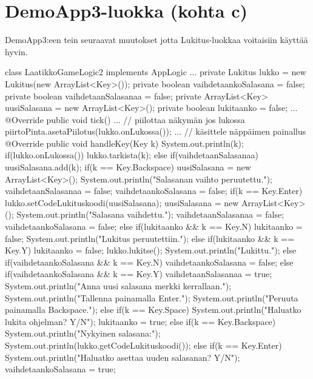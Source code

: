 \section{DemoApp3-luokka (kohta c)}

\label{DemoApp3-luokka}

DemoApp3:een tein seuraavat muutokset jotta Lukitus-luokkaa voitaisiin käyttää hyvin.

\begin{javacode}
class LaatikkoGameLogic2 implements AppLogic {
  ...
  private Lukitus lukko = new Lukitus(new ArrayList<Key>());
  private boolean vaihdetaankoSalasana = false;
  private boolean vaihdetaanSalasanaa = false;
  private ArrayList<Key> uusiSalasana = new ArrayList<Key>();
  private boolean lukitaanko = false;
  ...
  @Override
  public void tick() {
    ...
    // piilottaa näkymän jos lukossa
    piirtoPinta.asetaPiilotus(lukko.onLukossa());
    ...
  }
  // käsittele näppäimen painallus
  @Override
  public void handleKey(Key k) {
    System.out.println(k);
    if(lukko.onLukossa()) {
      lukko.tarkista(k);
    }
    else if(vaihdetaanSalasanaa) {
      uusiSalasana.add(k);
      if(k == Key.Backspace) {
        uusiSalasana = new ArrayList<Key>();
        System.out.println("Salasanan vaihto peruutettu.");
        vaihdetaanSalasanaa = false;
        vaihdetaankoSalasana = false;
      }
      if(k == Key.Enter) {
        lukko.setCodeLukituskoodi(uusiSalasana);
        uusiSalasana = new ArrayList<Key>();
        System.out.println("Salasana vaihdettu.");
        vaihdetaanSalasanaa = false;
        vaihdetaankoSalasana = false;
       }
    }
    else if(lukitaanko && k == Key.N) {
      lukitaanko = false;
      System.out.println("Lukitus peruutettiin.");
    }
    else if(lukitaanko && k == Key.Y) {
      lukitaanko = false;
      lukko.lukitse();
      System.out.println("Lukittu.");
    }
    else if(vaihdetaankoSalasana && k == Key.N) {
      vaihdetaankoSalasana = false;
    }
    else if(vaihdetaankoSalasana && k == Key.Y) {
      vaihdetaanSalasanaa = true;
      System.out.println("Anna uusi salasana merkki kerrallaan.");
      System.out.println("Tallenna painamalla Enter.");
      System.out.println("Peruuta painamalla Backspace.");
    }
    else if(k == Key.Space) {
      System.out.println("Haluatko lukita ohjelman? Y/N");
      lukitaanko = true;
    }
    else if(k == Key.Backspace) {
      System.out.println("Nykyinen salasana:");
      System.out.println(lukko.getCodeLukituskoodi());
    }
    else if(k == Key.Enter) {
      System.out.println("Haluatko asettaa uuden salasanan? Y/N");
      vaihdetaankoSalasana = true;
    }
  }
}
\end{javacode}

